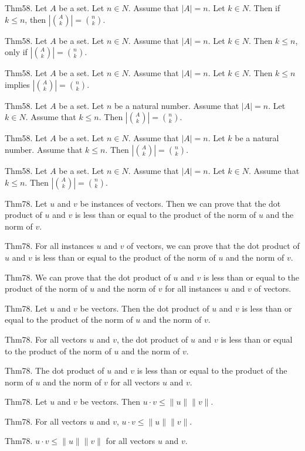 \documentclass{article}
\begin{document}
Thm58. Let $A$ be a set. Let $n \in N$. Assume that $| A | = n$. Let $k \in N$. Then if $k \leq n$, then $| \binom{ A }{ k}| = \binom{ n }{ k}$.

Thm58. Let $A$ be a set. Let $n \in N$. Assume that $| A | = n$. Let $k \in N$. Then $k \leq n$, only if $| \binom{ A }{ k}| = \binom{ n }{ k}$.

Thm58. Let $A$ be a set. Let $n \in N$. Assume that $| A | = n$. Let $k \in N$. Then $k \leq n$ implies $| \binom{ A }{ k}| = \binom{ n }{ k}$.

Thm58. Let $A$ be a set. Let $n$ be a natural number. Assume that $| A | = n$. Let $k \in N$. Assume that $k \leq n$. Then $| \binom{ A }{ k}| = \binom{ n }{ k}$.

Thm58. Let $A$ be a set. Let $n \in N$. Assume that $| A | = n$. Let $k$ be a natural number. Assume that $k \leq n$. Then $| \binom{ A }{ k}| = \binom{ n }{ k}$.

Thm58. Let $A$ be a set. Let $n \in N$. Assume that $| A | = n$. Let $k \in N$. Assume that $k \leq n$. Then $| \binom{ A }{ k}| = \binom{ n }{ k}$.

Thm78. Let $u$ and $v$ be instances of vectors. Then we can prove that the dot product of $u$ and $v$ is less than or equal to the product of the norm of $u$ and the norm of $v$.

Thm78. For all instances $u$ and $v$ of vectors, we can prove that the dot product of $u$ and $v$ is less than or equal to the product of the norm of $u$ and the norm of $v$.

Thm78. We can prove that the dot product of $u$ and $v$ is less than or equal to the product of the norm of $u$ and the norm of $v$ for all instances $u$ and $v$ of vectors.

Thm78. Let $u$ and $v$ be vectors. Then the dot product of $u$ and $v$ is less than or equal to the product of the norm of $u$ and the norm of $v$.

Thm78. For all vectors $u$ and $v$, the dot product of $u$ and $v$ is less than or equal to the product of the norm of $u$ and the norm of $v$.

Thm78. The dot product of $u$ and $v$ is less than or equal to the product of the norm of $u$ and the norm of $v$ for all vectors $u$ and $v$.

Thm78. Let $u$ and $v$ be vectors. Then $u \cdot v \leq \| u \| \| v \|$.

Thm78. For all vectors $u$ and $v$, $u \cdot v \leq \| u \| \| v \|$.

Thm78. $u \cdot v \leq \| u \| \| v \|$ for all vectors $u$ and $v$.
\end{document}
